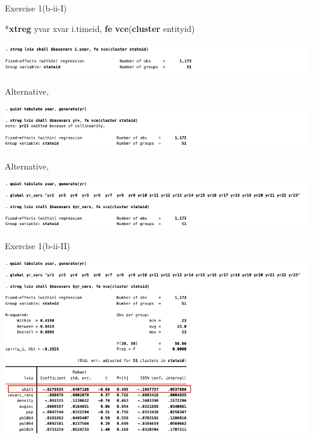 \documentclass[
  10pt,
  ignorenonframetext,
]{beamer}
\newenvironment{Shaded}{\begin{snugshade}}{\end{snugshade}}
\newcommand{\KeywordTok}[1]{\textcolor[rgb]{0.13,0.29,0.53}{\textbf{#1}}}
\newcommand{\NormalTok}[1]{#1}
\begin{document}
\begin{frame}[fragile]{Exercise 1(b-ii-I)}
\protect\hypertarget{exercise-1b-ii-i}{}
\footnotesize

\begin{Shaded}
\begin{Highlighting}[]
\NormalTok{*}\KeywordTok{xtreg}\NormalTok{ yvar xvar i.timeid, }\KeywordTok{fe} \KeywordTok{vce}\NormalTok{(}\KeywordTok{cluster}\NormalTok{ entityid)}
\end{Highlighting}
\end{Shaded}

\begin{flushleft}\includegraphics[width=0.95\linewidth]{pictures/Ex1-TwowayFEs-1} \end{flushleft}

\tiny Alternative,

\begin{flushleft}\includegraphics[width=0.95\linewidth]{pictures/Ex1-TwowayFEs-2} \end{flushleft}

\tiny Alternative,

\begin{flushleft}\includegraphics[width=0.95\linewidth]{pictures/Ex1-TwowayFEs-3} \end{flushleft}
\end{frame}

\begin{frame}{Exercise 1(b-ii-II)}
\protect\hypertarget{Ex1-TwowayFEs-4}{}
\begin{flushleft}\includegraphics[width=1.05\linewidth]{pictures/Ex1-TwowayFEs-4} \end{flushleft}
\end{frame}
\end{document}
